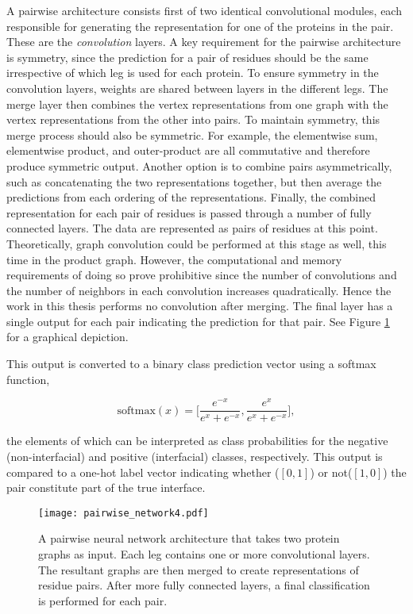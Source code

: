 A pairwise architecture consists first of two identical convolutional modules, each responsible for generating the representation for one of the proteins in the pair.
These are the \emph{convolution} layers.
A key requirement for the pairwise architecture is symmetry, since the prediction for a pair of residues should be the same irrespective of which leg is used for each protein.
To ensure symmetry in the convolution layers, weights are shared between layers in the different legs.
The merge layer then combines the vertex representations from one graph with the vertex representations from the other into pairs.
To maintain symmetry, this merge process should also be symmetric.
For example, the elementwise sum, elementwise product, and outer-product are all commutative and therefore produce symmetric output.
Another option is to combine pairs asymmetrically, such as concatenating the two representations together, but then average the predictions from each ordering of the representations.
Finally, the combined representation for each pair of residues is passed through a number of fully connected layers.
The data are represented as pairs of residues at this point. 
Theoretically, graph convolution could be performed at this stage as well, this time in the product graph.
However, the computational and memory requirements of doing so prove prohibitive since the number of convolutions and the number of neighbors in each convolution increases quadratically.
Hence the work in this thesis performs no convolution after merging.
The final layer has a single output for each pair indicating the prediction for that pair.
See Figure \ref{fig:pairwise_arch1} for a graphical depiction.

This output is converted to a binary class prediction vector using a softmax function, 

\begin{equation}
\text{softmax}(x) = \bigg[ \frac{e^{-x}}{e^{x} + e^{-x}} , \frac{e^{x}}{e^{x} + e^{-x}} \bigg],
\label{eq:softmax}
\end{equation}

\noindent
the elements of which can be interpreted as class probabilities for the negative (non-interfacial) and positive (interfacial) classes, respectively.
This output is compared to a one-hot label vector indicating whether \big($[0, 1]$\big) or not\big($[1, 0]$\big) the pair constitute part of the true interface. 

\begin{figure}
	\texttt{[image: pairwise\_network4.pdf]}
	\caption{A pairwise neural network architecture that takes two protein graphs as input. Each leg contains one or more convolutional layers. The resultant graphs are then merged to create representations of residue pairs. After more fully connected layers, a final classification is performed for each pair.}
	\label{fig:pairwise_arch1}
\end{figure}


